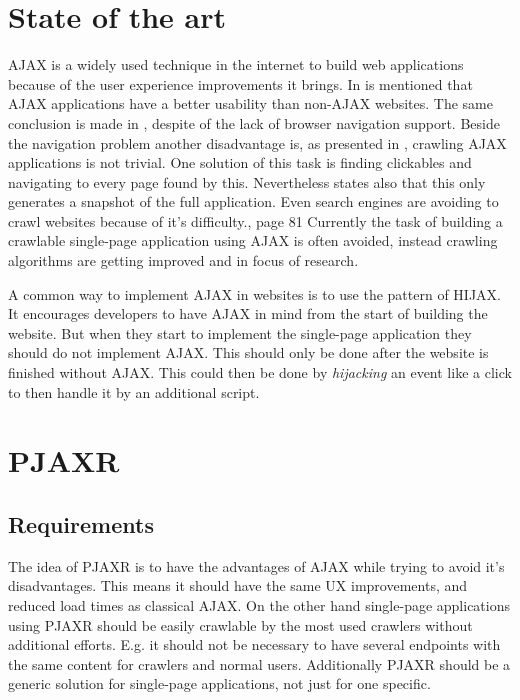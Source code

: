 \documentclass[f,bachelor,binding,twoside,palatino]{WeSTthesis}
\def \ajax {AJAX}
\def \pjaxr {PJAXR}
\def \singlePageApplication {single-page application}
\begin{document}
\section{State of the art}
  \ajax{} is a widely used technique in the internet to build web applications because of the user experience improvements it brings.
  In \cite{roodt06} is mentioned that \ajax{} applications have a better usability than non-\ajax{} websites.
  The same conclusion is made in \cite{klugeKarglWeber07}, despite of the lack of browser navigation support.
  Beside the navigation problem another disadvantage is, as presented in \cite{mesbah09}, crawling \ajax{} applications is not trivial.
  One solution of this task is finding clickables and navigating to every page found by this.
  Nevertheless \cite{mesbah09} states also that this only generates a snapshot of the full application.
  Even search engines are avoiding to crawl websites because of it's difficulty.\cite{matter08}, page 81
  Currently the task of building a crawlable \singlePageApplication{} using \ajax{} is often avoided, instead crawling algorithms are getting improved and in focus of research.

  A common way to implement \ajax{} in websites is to use the pattern of HIJAX.
  It encourages developers to have \ajax{} in mind from the start of building the website. 
  But when they start to implement the \singlePageApplication{} they should do not implement \ajax{}.
  This should only be done after the website is finished without \ajax{}.
  This could then be done by \emph{hijacking} an event like a click to then handle it by an additional script.

  
\section{\pjaxr{}}
  \subsection{Requirements}
  The idea of \pjaxr{} is to have the advantages of \ajax{} while trying to avoid it's disadvantages.
  This means it should have the same UX improvements, and reduced load times as classical \ajax{}.
  On the other hand \singlePageApplication{}s using \pjaxr{} should be easily crawlable by the most used crawlers without additional efforts.
  E.g. it should not be necessary to have several endpoints with the same content for crawlers and normal users.
  Additionally \pjaxr{} should be a generic solution for \singlePageApplication{}s, not just for one specific.
\end{document}
